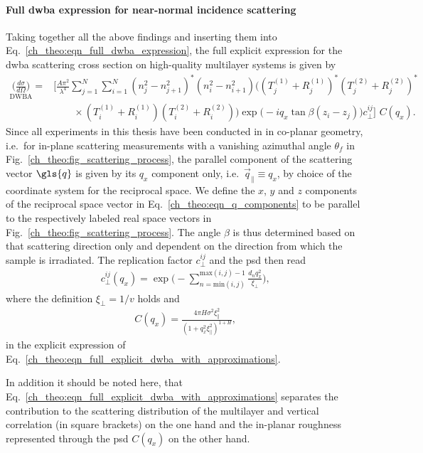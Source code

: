 \paragraph{Full \gls{dwba} expression for near-normal incidence scattering}
Taking together all the above findings and inserting them into Eq.~\eqref{ch_theo:eqn_full_dwba_expression}, the full explicit expression for the \gls{dwba} scattering cross section on high-quality multilayer systems is given by
    \begin{align}
        {\underset{\text{DWBA}}{\Big(\frac{d \sigma}{d \Omega}\Big)}} = &\Bigg[\frac{A \pi^2}{\lambda^4}\sum \limits_{j=1}^{N}\sum \limits_{i=1}^{N} (n_j^2 - n_{j+1}^2)^* (n_i^2 - n_{i+1}^2)\Big( (T^{(1)}_j + R^{(1)}_j)^* (T^{(2)}_j + R^{(2)}_j)^* \nonumber \\ &\qquad\times(T^{(1)}_i + R^{(1)}_i) (T^{(2)}_i + R^{(2)}_i) \Big) \exp\Big(-i q_x \tan \beta (z_i-z_j)\Big) c_\perp^{i j}\Bigg]\,\, C(q_x) \text{.} \label{ch_theo:eqn_full_explicit_dwba_with_approximations}
    \end{align}
Since all experiments in this thesis have been conducted in in co-planar geometry, i.e.~for in-plane scattering measurements with a vanishing azimuthal angle $\theta_f$ in Fig.~\ref{ch_theo:fig_scattering_process}, the parallel component of the scattering vector $\gls{q}$ is given by its $q_x$ component only, i.e.~$\vec{q}_\parallel \equiv q_x$, by choice of the coordinate system for the reciprocal space. We define the $x$, $y$ and $z$ components of the reciprocal space vector in Eq.~\eqref{ch_theo:eqn_q_components} to be parallel to the respectively labeled real space vectors in Fig.~\ref{ch_theo:fig_scattering_process}. The angle $\beta$ is thus determined based on that scattering direction only and dependent on the direction from which the sample is irradiated. The replication factor $c_\perp^{i j}$ and the \gls{psd} then read
\begin{align}
c_\perp^{i j}(q_x) =  \exp\Bigg(-\sum \limits_{n = \text{min}(i,j)}^{\text{max}(i,j)-1}\frac{d_n q_x^2}{\xi_\perp} \Bigg)\text{,}
\end{align}
where the definition $\xi_\perp = 1/v$ holds and
\begin{align}
C(q_x) = \frac{4 \pi H \sigma^2 \xi_\parallel^2}{(1+q_x^2\xi_\parallel^2)^{1+H}} \text{,}
\end{align}
in the explicit expression of Eq.~\eqref{ch_theo:eqn_full_explicit_dwba_with_approximations}.

In addition it should be noted here, that Eq.~\eqref{ch_theo:eqn_full_explicit_dwba_with_approximations} separates the contribution to the scattering distribution of the multilayer and vertical correlation (in square brackets) on the one hand and the in-planar roughness represented through the \gls{psd} $C(q_x)$ on the other hand.

